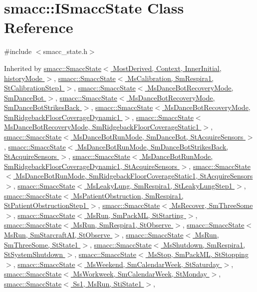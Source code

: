\hypertarget{classsmacc_1_1ISmaccState}{}\section{smacc\+:\+:I\+Smacc\+State Class Reference}
\label{classsmacc_1_1ISmaccState}


{\ttfamily \#include $<$smacc\+\_\+state.\+h$>$}



Inherited by \hyperlink{classsmacc_1_1SmaccState}{smacc\+::\+Smacc\+State$<$ Most\+Derived, Context, Inner\+Initial, history\+Mode $>$}, \hyperlink{classsmacc_1_1SmaccState}{smacc\+::\+Smacc\+State$<$ Ms\+Calibration, Sm\+Respira1, St\+Calibration\+Step1 $>$}, \hyperlink{classsmacc_1_1SmaccState}{smacc\+::\+Smacc\+State$<$ Ms\+Dance\+Bot\+Recovery\+Mode, Sm\+Dance\+Bot $>$}, \hyperlink{classsmacc_1_1SmaccState}{smacc\+::\+Smacc\+State$<$ Ms\+Dance\+Bot\+Recovery\+Mode, Sm\+Dance\+Bot\+Strikes\+Back $>$}, \hyperlink{classsmacc_1_1SmaccState}{smacc\+::\+Smacc\+State$<$ Ms\+Dance\+Bot\+Recovery\+Mode, Sm\+Ridgeback\+Floor\+Coverage\+Dynamic1 $>$}, \hyperlink{classsmacc_1_1SmaccState}{smacc\+::\+Smacc\+State$<$ Ms\+Dance\+Bot\+Recovery\+Mode, Sm\+Ridgeback\+Floor\+Coverage\+Static1 $>$}, \hyperlink{classsmacc_1_1SmaccState}{smacc\+::\+Smacc\+State$<$ Ms\+Dance\+Bot\+Run\+Mode, Sm\+Dance\+Bot, St\+Acquire\+Sensors $>$}, \hyperlink{classsmacc_1_1SmaccState}{smacc\+::\+Smacc\+State$<$ Ms\+Dance\+Bot\+Run\+Mode, Sm\+Dance\+Bot\+Strikes\+Back, St\+Acquire\+Sensors $>$}, \hyperlink{classsmacc_1_1SmaccState}{smacc\+::\+Smacc\+State$<$ Ms\+Dance\+Bot\+Run\+Mode, Sm\+Ridgeback\+Floor\+Coverage\+Dynamic1, St\+Acquire\+Sensors $>$}, \hyperlink{classsmacc_1_1SmaccState}{smacc\+::\+Smacc\+State$<$ Ms\+Dance\+Bot\+Run\+Mode, Sm\+Ridgeback\+Floor\+Coverage\+Static1, St\+Acquire\+Sensors $>$}, \hyperlink{classsmacc_1_1SmaccState}{smacc\+::\+Smacc\+State$<$ Ms\+Leaky\+Lung, Sm\+Respira1, St\+Leaky\+Lung\+Step1 $>$}, \hyperlink{classsmacc_1_1SmaccState}{smacc\+::\+Smacc\+State$<$ Ms\+Patient\+Obstruction, Sm\+Respira1, St\+Patient\+Obstruction\+Step1 $>$}, \hyperlink{classsmacc_1_1SmaccState}{smacc\+::\+Smacc\+State$<$ Ms\+Recover, Sm\+Three\+Some $>$}, \hyperlink{classsmacc_1_1SmaccState}{smacc\+::\+Smacc\+State$<$ Ms\+Run, Sm\+Pack\+M\+L, St\+Starting $>$}, \hyperlink{classsmacc_1_1SmaccState}{smacc\+::\+Smacc\+State$<$ Ms\+Run, Sm\+Respira1, St\+Observe $>$}, \hyperlink{classsmacc_1_1SmaccState}{smacc\+::\+Smacc\+State$<$ Ms\+Run, Sm\+Starcraft\+A\+I, St\+Observe $>$}, \hyperlink{classsmacc_1_1SmaccState}{smacc\+::\+Smacc\+State$<$ Ms\+Run, Sm\+Three\+Some, St\+State1 $>$}, \hyperlink{classsmacc_1_1SmaccState}{smacc\+::\+Smacc\+State$<$ Ms\+Shutdown, Sm\+Respira1, St\+System\+Shutdown $>$}, \hyperlink{classsmacc_1_1SmaccState}{smacc\+::\+Smacc\+State$<$ Ms\+Stop, Sm\+Pack\+M\+L, St\+Stopping $>$}, \hyperlink{classsmacc_1_1SmaccState}{smacc\+::\+Smacc\+State$<$ Ms\+Weekend, Sm\+Calendar\+Week, St\+Saturday $>$}, \hyperlink{classsmacc_1_1SmaccState}{smacc\+::\+Smacc\+State$<$ Ms\+Workweek, Sm\+Calendar\+Week, St\+Monday $>$}, \hyperlink{classsmacc_1_1SmaccState}{smacc\+::\+Smacc\+State$<$ Ss1, Ms\+Run, Sti\+State1 $>$}, 